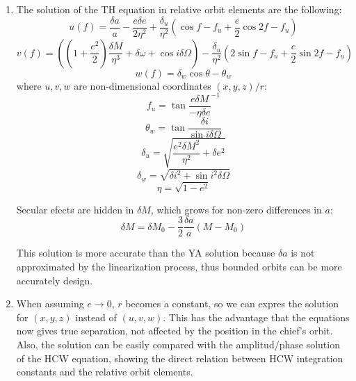 \documentclass[a4paper]{article}
\begin{document}
\begin{enumerate}[label=\emph{\alph*)}]
  \item %
    The solution of the TH equation in relative orbit elements are the following:
    \[u(f) = \frac{\delta a}{a} - \frac{e \delta e}{2\eta^2}+\frac{\delta_u}{\eta^2} \left(\cos{f-f_u}+\frac{e}{2}\cos{2f-f_u} \right) \]
    \[v(f) = \left( \left(1+\frac{e^2}{2}\right) \frac{\delta M}{\eta^3}+\delta \omega + \cos{i\delta\Omega}\right) - \frac{\delta_u}{\eta^2}\left( 2\sin{f-f_u}+\frac{e}{2}\sin{2f-f_u}\right)\]
    \[w(f) = \delta_w\cos{\theta-\theta_w} \]
    where $u,v,w$ are non-dimensional coordinates $(x,y,z)/r$: 
    \[f_u = \tan{\frac{e\delta M}{-\eta\delta e}}^{-1}\]
    \[\theta_w = \tan{\frac{\delta i}{\sin{i \delta \Omega}}} \]
    \[\delta_u = \sqrt{\frac{e^2\delta M^2}{\eta^2}+\delta e^2} \]
    \[\delta_w = \sqrt{\delta i^2+\sin{i}^2\delta\Omega} \]
    \[\eta = \sqrt{1-e^2} \]

    Secular efects are hidden in $\delta M$, which grows for non-zero differences in $a$:
    \[\delta M = \delta M_0 - \frac{3}{2}\frac{\delta a}{a}(M-M_0)\]

    This solution is more accurate than the YA solution because $\delta a$ is not approximated by the linearization process, thus bounded orbits can be more accurately design.

  \item %
    When assuming $e\rightarrow 0$, $r$ becomes a constant, so we can expres the solution for $(x,y,z)$ instead of $(u,v,w)$. This has the advantage that the equations now gives true separation, not affected by the position in the chief's orbit. Also, the solution can be easily compared with the amplitud/phase solution of the HCW equation, showing the direct relation between HCW integration constants and the relative orbit elements.


\end{enumerate}
\end{document}

